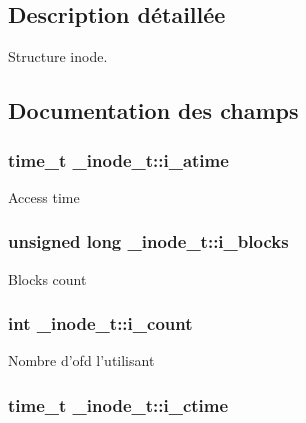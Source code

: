 \subsection{Description détaillée}
Structure inode. 

\subsection{Documentation des champs}
\hypertarget{struct__inode__t_a01f50c6c44a3b50e4414a794643b741f}{
\subsubsection[{i\-\_\-atime}]{\setlength{\rightskip}{0pt plus 5cm}time\-\_\-t \-\_\-inode\-\_\-t\-::i\-\_\-atime}}\label{struct__inode__t_a01f50c6c44a3b50e4414a794643b741f}
Access time \hypertarget{struct__inode__t_a92ebe4c1e93af9fba4efae4d07e14858}{
\subsubsection[{i\-\_\-blocks}]{\setlength{\rightskip}{0pt plus 5cm}unsigned long \-\_\-inode\-\_\-t\-::i\-\_\-blocks}}\label{struct__inode__t_a92ebe4c1e93af9fba4efae4d07e14858}
Blocks count \hypertarget{struct__inode__t_a8ea768d56d01e010bc0c809bc38dbb28}{
\subsubsection[{i\-\_\-count}]{\setlength{\rightskip}{0pt plus 5cm}int \-\_\-inode\-\_\-t\-::i\-\_\-count}}\label{struct__inode__t_a8ea768d56d01e010bc0c809bc38dbb28}
Nombre d'ofd l'utilisant \hypertarget{struct__inode__t_a73ee1e604547b74b8e1045fd4f6699b6}{
\subsubsection[{i\-\_\-ctime}]{\setlength{\rightskip}{0pt plus 5cm}time\-\_\-t \-\_\-inode\-\_\-t\-::i\-\_\-ctime}}\label{struct__inode__t_a73ee1e604547b74b8e1045fd4f6699b6}
